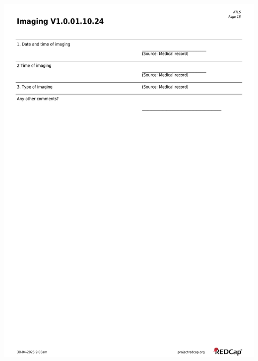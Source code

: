 \documentclass[
]{scrartcl}
\begin{document}
\includegraphics{../case-record-form/instrument-pdfs/pages/all-instruments-15.pdf}
\end{document}
